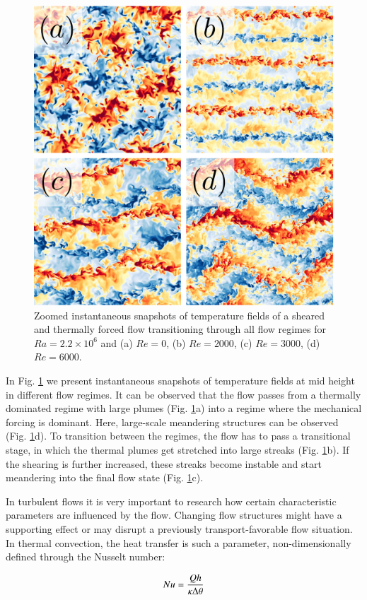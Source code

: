 \documentclass[5p,times]{elsarticle}
\begin{document}
\begin{figure}
	\centering
	\includegraphics[width=0.8\linewidth]{squaredoverview}%
	\caption{\label{fig:overview} Zoomed instantaneous snapshots of temperature fields
of a sheared and thermally forced flow transitioning through all flow regimes
for $ Ra=2.2 \times 10^6 $ and (a) $ Re=0 $, (b) $ Re=2000 $, (c) $ Re=3000 $, (d) $ Re=6000 $.}
\end{figure}

In Fig. \ref{fig:overview} we present instantaneous snapshots of temperature
fields at mid height in different flow regimes. It can be observed that the flow passes from a
thermally dominated regime with large plumes (Fig. \ref{fig:overview}a) into a
regime where the mechanical forcing is dominant. Here, large-scale meandering
structures can be observed (Fig. \ref{fig:overview}d). To transition between the
regimes, the flow has to pass a transitional stage, in which the thermal plumes
get stretched into large streaks (Fig. \ref{fig:overview}b). If the shearing is
further increased, these streaks become instable and start meandering into the
final flow state (Fig. \ref{fig:overview}c).

In turbulent flows it is very important to research how certain characteristic
parameters are influenced by the flow. Changing flow structures might have a
supporting effect or may disrupt a previously transport-favorable flow situation. 
In thermal convection, the heat transfer is such a parameter, non-dimensionally
defined through the Nusselt number:

\begin{equation} %
Nu= \frac{Qh}{\kappa \Delta \theta}
\label{eqn:nusselt} \\[8pt]
\end{equation} 
\end{document}
